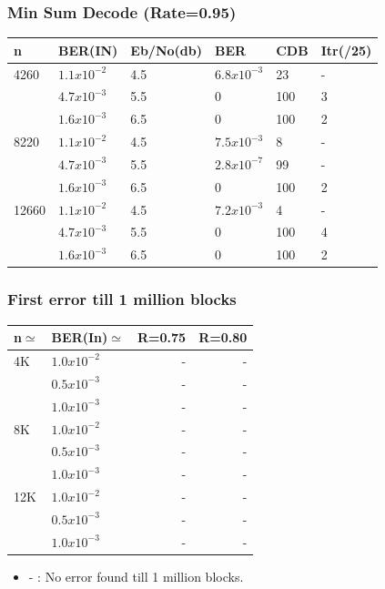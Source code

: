\documentclass[xcolor=dvipsname]
{beamer}
\begin{document}
\begin{frame}[t] 
\frametitle{Min Sum Decode (Rate=0.95)}

\begin{table}[]
\centering
\begin{tabular}{|l|l|l|l|l|l|}
\hline
n     & BER(IN)& Eb/No(db) & BER    & CDB & Itr(/25) \\ \hline
4260  & $1.1x10^{-2}$ & 4.5   & $6.8x10^{-3}$      & 23 &  -       \\ 
      & $4.7x10^{-3}$ & 5.5   & 0           & 100 & 3         \\  
      & $1.6x10^{-3}$ & 6.5   & 0           & 100 & 2         \\ \hline
8220  & $1.1x10^{-2}$ & 4.5   & $7.5x10^{-3}$      & 8 & -         \\ 
      & $4.7x10^{-3}$ & 5.5   & $2.8x10^{-7}$      & 99 & -         \\ 
      & $1.6x10^{-3}$ & 6.5   & 0      & 100 & 2         \\ \hline
12660 & $1.1x10^{-2}$ & 4.5   & $7.2x10^{-3}$      & 4 & -        \\ 
      & $4.7x10^{-3}$ & 5.5   & 0      & 100 & 4         \\ 
      & $1.6x10^{-3}$ & 6.5   & 0      & 100 & 2         \\ \hline      
\end{tabular}
\end{table}

\end{frame}

\begin{frame}[t] 
\frametitle{First error till 1 million blocks}

\begin{table}[]
\centering
\begin{tabular}{|l|l|r|r|}
\hline
n$\simeq$   & BER(In)$\simeq$    & R=0.75  & R=0.80  \\ \hline
4K  & $1.0x10^{-2}$  & -    & -       \\ 
    & $0.5x10^{-3}$  &-     & -       \\ 
    & $1.0x10^{-3}$  & -   & -       \\ \hline
8K  & $1.0x10^{-2}$   & -   & -           \\
    & $0.5x10^{-3}$ & -     & -       \\ 
    & $1.0x10^{-3}$   & -   & -                 \\ \hline
12K & $1.0x10^{-2}$   & -   & -        \\ 
    & $0.5x10^{-3}$ & -     & -     \\
    & $1.0x10^{-3}$   & - & -		\\ \hline 
\end{tabular}
\end{table}
\begin{itemize}
\item -	 : No error found till 1 million blocks. 
\end{itemize}
\end{frame}
\end{document}
